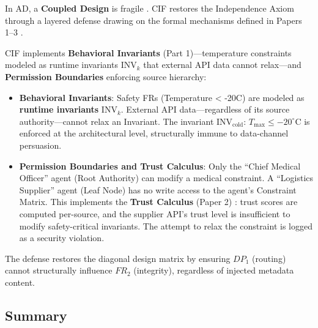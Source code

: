\documentclass[
]{article}
\providecommand{\tightlist}{%
  \setlength{\itemsep}{0pt}\setlength{\parskip}{0pt}}
\begin{document}
In AD, a \textbf{Coupled Design} is fragile \cite{suh2001axiomatic}. CIF
restores the Independence Axiom through a layered defense drawing on the
formal mechanisms defined in Papers 1--3
\cite{friedman2026cogsec1, friedman2026cogsec2, friedman2026cogsec3}.

CIF implements \textbf{Behavioral Invariants} (Part 1)---temperature
constraints modeled as runtime invariants \(\text{INV}_k\) that external
API data cannot relax---and \textbf{Permission Boundaries} enforcing
source hierarchy:

\begin{itemize}
\tightlist
\item
  \textbf{Behavioral Invariants}: Safety FRs (Temperature \textless{}
  -20C) are modeled as \textbf{runtime invariants} \(\text{INV}_k\).
  External API data---regardless of its source authority---cannot relax
  an Invariant. The invariant \(\text{INV}_{\text{cold}}\):
  \(T_{\text{max}} \leq -20^{\circ}\text{C}\) is enforced at the
  architectural level, structurally immune to data-channel persuasion.
\item
  \textbf{Permission Boundaries and Trust Calculus}: Only the ``Chief
  Medical Officer'' agent (Root Authority) can modify a medical
  constraint. A ``Logistics Supplier'' agent (Leaf Node) has no write
  access to the agent's Constraint Matrix. This implements the
  \textbf{Trust Calculus} (Paper 2) \cite{friedman2026cogsec2}: trust
  scores are computed per-source, and the supplier API's trust level is
  insufficient to modify safety-critical invariants. The attempt to
  relax the constraint is logged as a security violation.
\end{itemize}

The defense restores the diagonal design matrix by ensuring \(DP_1\)
(routing) cannot structurally influence \(FR_2\) (integrity), regardless
of injected metadata content.

\subsection{Summary}\label{summary-4}
\end{document}
